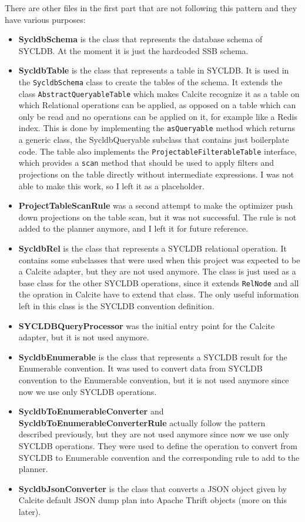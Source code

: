 \documentclass[a4paper, 10pt]{article}
\begin{document}
There are other files in the first part that are not following this pattern and they have various purposes:
\begin{itemize}
    \item \textbf{SycldbSchema} is the class that represents the database schema of SYCLDB. At the moment it is just the hardcoded SSB schema.
    \item \textbf{SycldbTable} is the class that represents a table in SYCLDB. It is used in the \texttt{SycldbSchema} class to create the tables of the schema. It extends the class \texttt{AbstractQueryableTable} which makes Calcite recognize it as a table on which Relational operations can be applied, as opposed on a table which can only be read and no operations can be applied on it, for example like a Redis index. This is done by implementing the \texttt{asQueryable} method which returns a generic class, the SycldbQueryable subclass that contains just boilerplate code. The table also implements the \texttt{ProjectableFilterableTable} interface, which provides a \texttt{scan} method that should be used to apply filters and projections on the table directly without intermediate expressions. I was not able to make this work, so I left it as a placeholder.
    \item \textbf{ProjectTableScanRule} was a second attempt to make the optimizer push down projections on the table scan, but it was not successful. The rule is not added to the planner anymore, and I left it for future reference.
    \item \textbf{SycldbRel} is the class that represents a SYCLDB relational operation. It contains some subclasses that were used when this project was expected to be a Calcite adapter, but they are not used anymore. The class is just used as a base class for the other SYCLDB operations, since it extends \texttt{RelNode} and all the opration in Calcite have to extend that class. The only useful information left in this class is the SYCLDB convention definition.
    \item \textbf{SYCLDBQueryProcessor} was the initial entry point for the Calcite adapter, but it is not used anymore.
    \item \textbf{SycldbEnumerable} is the class that represents a SYCLDB result for the Enumerable convention. It was used to convert data from SYCLDB convention to the Enumerable convention, but it is not used anymore since now we use only SYCLDB operations.
    \item \textbf{SycldbToEnumerableConverter} and \textbf{SycldbToEnumerableConverterRule} actually follow the pattern described previously, but they are not used anymore since now we use only SYCLDB operations. They were used to define the operation to convert from SYCLDB to Enumerable convention and the corresponding rule to add to the planner.
    \item \textbf{SycldbJsonConverter} is the class that converts a JSON object given by Calcite default JSON dump plan into Apache Thrift objects (more on this later).
\end{itemize}
\end{document}
